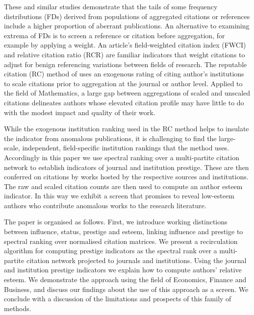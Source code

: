 \documentclass[10pt]{article}
\begin{document}
These and similar studies demonstrate that the tails of some frequency distributions (FDs) derived from populations of aggregated citations or references include a higher proportion of aberrant publications. An alternative to examining extrema of FDs is to screen a reference or citation before aggregation, for example by applying a weight.  An article's field-weighted citation index (FWCI) and relative citation ratio (RCR) are familiar indicators that weight citations to adjust for benign referencing variations between fields of research. The reputable citation (RC) method of \cite{safonScreeningArticlesCitation2025} uses an exogenous rating of citing author's institutions to scale citations prior to aggregation at the journal or author level. Applied to the field of Mathematics, a large gap between aggregations of scaled and unscaled citations delineates authors whose elevated citation profile may have little to do with the modest impact and quality of their work.

While the exogenous institution ranking used in the RC method helps to insulate the indicator from anomalous publications, it is challenging to find the large-scale, independent, field-specific institution rankings that the method uses. Accordingly in this paper we use spectral ranking over a multi-partite citation network to establish indicators of journal and institution prestige. These are then conferred on citations by works hosted by the respective sources and institutions. The raw and scaled citation counts are then used to compute an author esteem indicator. In this way we exhibit a screen that promises to reveal low-esteem authors who contribute anomalous works to the research literature.

The paper is organised as follows. First, we introduce working distinctions between influence, status, prestige and esteem, linking influence and prestige to spectral ranking over normalised citation matrices. We present a recirculation algorithm for computing prestige indicators as the spectral rank over a multi-partite citation network projected to journals and institutions. Using the journal and institution prestige indicators we explain how to compute authors' relative esteem. We demonstrate the approach using the field of Economics, Finance and Business, and discuss our findings about the use of this approach as a screen. We conclude with a discussion of the limitations and prospects of this family of methods. 
\end{document}
